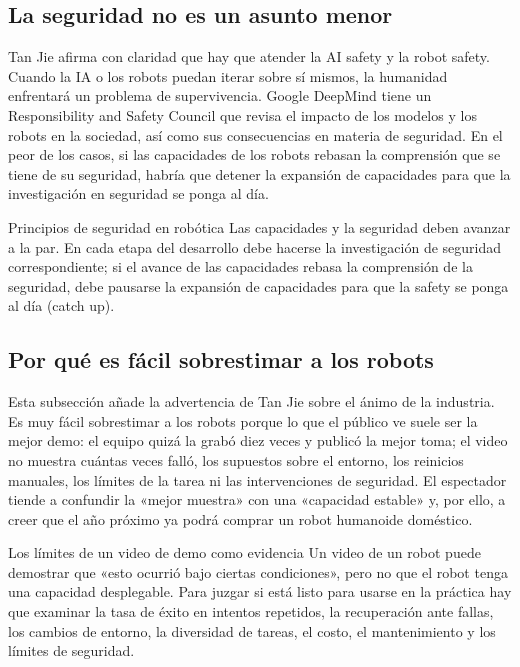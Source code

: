 \documentclass[a4paper]{article}
\begin{document}
\subsection{La seguridad no es un asunto menor}

Tan Jie afirma con claridad que hay que atender la AI safety y la robot safety. Cuando la IA o los robots puedan iterar sobre sí mismos, la humanidad enfrentará un problema de supervivencia. Google DeepMind tiene un Responsibility and Safety Council que revisa el impacto de los modelos y los robots en la sociedad, así como sus consecuencias en materia de seguridad. En el peor de los casos, si las capacidades de los robots rebasan la comprensión que se tiene de su seguridad, habría que detener la expansión de capacidades para que la investigación en seguridad se ponga al día.

\begin{importantbox}{Principios de seguridad en robótica}
Las capacidades y la seguridad deben avanzar a la par. En cada etapa del desarrollo debe hacerse la investigación de seguridad correspondiente; si el avance de las capacidades rebasa la comprensión de la seguridad, debe pausarse la expansión de capacidades para que la safety se ponga al día (catch up).
\end{importantbox}

\subsection{Por qué es fácil sobrestimar a los robots}

Esta subsección añade la advertencia de Tan Jie sobre el ánimo de la industria. Es muy fácil sobrestimar a los robots porque lo que el público ve suele ser la mejor demo: el equipo quizá la grabó diez veces y publicó la mejor toma; el video no muestra cuántas veces falló, los supuestos sobre el entorno, los reinicios manuales, los límites de la tarea ni las intervenciones de seguridad. El espectador tiende a confundir la «mejor muestra» con una «capacidad estable» y, por ello, a creer que el año próximo ya podrá comprar un robot humanoide doméstico.

\begin{warningbox}{Los límites de un video de demo como evidencia}
Un video de un robot puede demostrar que «esto ocurrió bajo ciertas condiciones», pero no que el robot tenga una capacidad desplegable. Para juzgar si está listo para usarse en la práctica hay que examinar la tasa de éxito en intentos repetidos, la recuperación ante fallas, los cambios de entorno, la diversidad de tareas, el costo, el mantenimiento y los límites de seguridad.
\end{warningbox}
\end{document}

